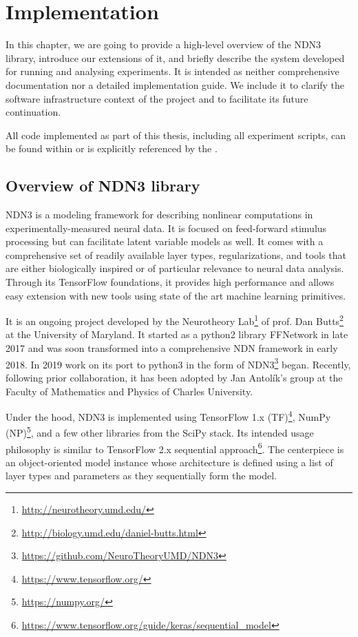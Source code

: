 \chapter{Implementation}\label{ch:3}
In this chapter, we are going to provide a high-level overview of the NDN3 library, introduce our extensions of it, and briefly describe the system developed for running and analysing experiments. It is intended as neither comprehensive documentation nor a detailed implementation guide. We include it to clarify the software infrastructure context of the project and to facilitate its future continuation. 

All code implemented as part of this thesis, including all experiment scripts, can be found within or is explicitly referenced by the .

\section{Overview of NDN3 library}
NDN3 is a modeling framework for describing nonlinear computations in expe\-rimentally-measured neural data. It is focused on feed-forward stimulus processing but can facilitate latent variable models as well. It comes with a comprehensive set of readily available layer types, regularizations, and tools that are either biologically inspired or of particular relevance to neural data analysis. Through its TensorFlow foundations, it provides high performance and allows easy extension with new tools using state of the art machine learning primitives.

It is an ongoing project developed by the Neurotheory Lab\footnote{\href{http://neurotheory.umd.edu/}{http://neurotheory.umd.edu/}} of prof. Dan Butts\footnote{\href{http://biology.umd.edu/daniel-butts.html}{http://biology.umd.edu/daniel-butts.html}} at the University of Maryland. It started as a python2 library FFNetwork in late 2017 and was soon transformed into a comprehensive NDN framework in early 2018. In 2019 work on its port to python3 in the form of NDN3\footnote{\href{https://github.com/NeuroTheoryUMD/NDN3}{https://github.com/NeuroTheoryUMD/NDN3}} began. Recently, following prior collaboration, it has been adopted by Jan Antolík’s group at the Faculty of Mathematics and Physics of Charles University. 

Under the hood, NDN3 is implemented using TensorFlow 1.x (TF)\footnote{\href{https://www.tensorflow.org/}{https://www.tensorflow.org/}}, NumPy (NP)\footnote{\href{https://numpy.org/}{https://numpy.org/}}, and a few other libraries from the SciPy stack. Its intended usage philosophy is similar to TensorFlow 2.x sequential approach\footnote{\href{https://www.tensorflow.org/guide/keras/sequential_model}{https://www.tensorflow.org/guide/keras/sequential\_model}}. The centerpiece is an object-oriented model instance whose architecture is defined using a list of layer types and parameters as they sequentially form the model.


